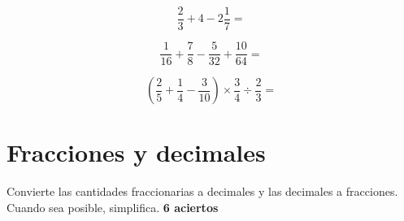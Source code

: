 \documentclass[11pt]{article}
\begin{document}
\vspace{5mm}

\begin{equation}
    \frac{2}{3} + 4 - 2 \frac{1}{7}= \nonumber
\end{equation}

\vspace{3cm}

\begin{equation}
    \frac{1}{16} + \frac{7}{8} - \frac{5}{32} + \frac{10}{64} = \nonumber
\end{equation}

\vspace{3cm}


\begin{equation}
    \left( \frac{2}{5} + \frac{1}{4} - \frac{3}{10} \right) \times \frac{3}{4} \div \frac{2}{3} = \nonumber
\end{equation}

\vspace{3cm}

\begin{multicols}{2}

\vspace{3cm}

\end{multicols}


\section{Fracciones y decimales}
Convierte las cantidades fraccionarias a decimales y las decimales a fracciones.
Cuando sea posible, simplifica.  \hfill \textbf{6 aciertos}
\end{document}
